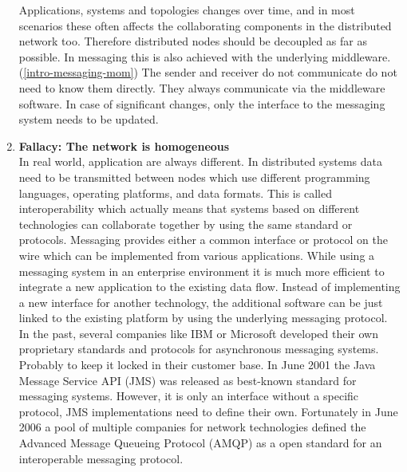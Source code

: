 \begin{enumerate}
{        Applications, systems and topologies changes over time, and in most
        scenarios these often affects the collaborating components in the
        distributed network too. Therefore distributed nodes should be decoupled as
        far as possible. In messaging this is also achieved with the underlying
        middleware.(\ref{intro-messaging-mom}) The sender and receiver do not
        communicate do not need to know them directly. They always communicate
        via the middleware software. In case of significant changes, only the
        interface to the messaging system needs to be updated. }
    \item{\textbf{Fallacy: The network is homogeneous}\hfill \\
        In real world, application are always different. In distributed systems
        data need to be transmitted between nodes which use different
        programming languages, operating platforms, and data formats.
        This is called interoperability  which actually means that
        systems based on different technologies can collaborate together by using
        the same standard or protocols. Messaging provides either a common
        interface or protocol on the wire which can be implemented from various
        applications. While using a messaging system in an
        enterprise environment it is much more efficient to integrate a new
        application to the existing data flow. Instead of implementing a new
        interface for another technology, the additional software can be just
        linked to the existing platform by using the underlying messaging
        protocol.\\

        In the past, several companies like IBM or Microsoft developed their own
        proprietary standards and protocols for asynchronous messaging systems.
        Probably to keep it locked in their customer base. In June 2001 the Java
        Message Service API (JMS) was released as best-known standard for
        messaging systems. However, it is only an interface without a specific
        protocol, JMS implementations need to define their own. Fortunately in
        June 2006 a pool of multiple companies for network technologies defined
        the Advanced Message Queueing Protocol (AMQP) as a open standard for an
        interoperable messaging protocol. \cite{PrpAMQP}
    }
\end{enumerate} \cite{EIP03}\cite{fallacies}

\newpage

